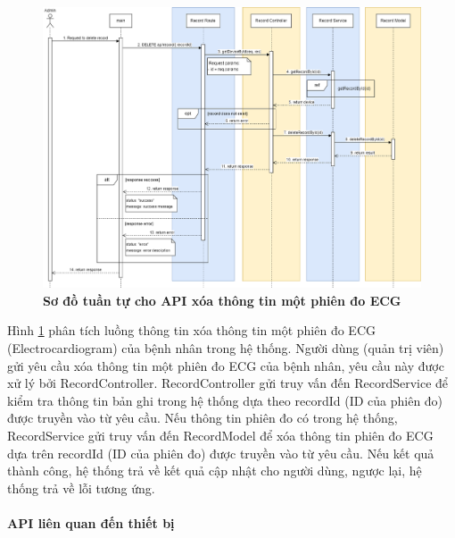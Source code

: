  \begin{figure}[H]
  \centering
  \includegraphics[scale=0.4]{Images/sequence_api/deleteRecordById.png}
  \caption[Sơ đồ tuần tự cho API xóa thông tin một phiên đo ECG ]{\bfseries \fontsize{12pt}{0pt}
  \selectfont Sơ đồ tuần tự cho API xóa thông tin một phiên đo ECG }
  \label{api_deleteRecordById} %
\end{figure}
Hình \ref{api_deleteRecordById} phân tích luồng thông tin xóa thông tin một phiên đo ECG (Electrocardiogram) của bệnh nhân trong hệ thống. Người dùng (quản trị viên) gửi yêu cầu xóa thông tin một phiên đo ECG của bệnh nhân,  
yêu cầu này được xử lý bởi RecordController. RecordController gửi truy vấn đến RecordService để kiểm tra thông tin bản ghi trong hệ thống dựa theo recordId (ID của phiên đo) được truyền vào từ yêu cầu.
Nếu thông tin phiên đo có trong hệ thống, RecordService gửi truy vấn đến RecordModel để xóa thông tin phiên đo ECG dựa trên recordId (ID của phiên đo) được truyền vào từ yêu cầu. Nếu kết quả thành công, hệ thống trả về kết quả cập nhật cho người dùng, ngược lại, hệ thống trả về lỗi tương ứng.


\paragraph{API liên quan đến thiết bị}
\mbox{}

